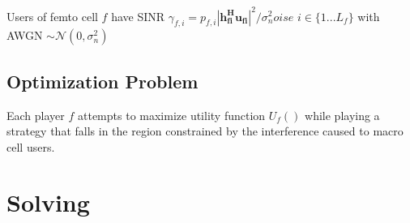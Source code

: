 \documentclass[12pt]{article}
\begin{document}
Users of femto cell $f$ have SINR $\gamma_{f,i} = p_{f,i}|\mathbf{h^H_{fi}u_{fi}}|^2/\sigma^2_noise$   $i \in \{1 ... L_f\}$
with AWGN $\sim \mathcal{N}(0,\sigma^2_n)$
\\

\subsection{Optimization Problem}

Each player $f$ attempts to maximize utility function $U_f()$ while playing a strategy that falls in the region constrained by the interference caused to macro cell users.


\section{Solving}
\end{document}
